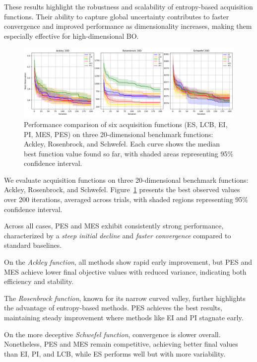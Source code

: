 \documentclass{ut-thesis}
\begin{document}
These results highlight the robustness and scalability of entropy-based acquisition functions. Their ability to capture global uncertainty contributes to faster convergence and improved performance as dimensionality increases, making them especially effective for high-dimensional BO.

\begin{figure}[!t]
    \centering
    \includegraphics[width=\textwidth]{across_function.png}
    \caption[20-Dimension benchmark comparison of acquisition functions]{
        Performance comparison of six acquisition functions (ES, LCB, EI, PI, MES, PES) on three 20-dimensional benchmark functions: Ackley, Rosenbrock, and Schwefel.
        Each curve shows the median best function value found so far, with shaded areas representing 95\% confidence interval.
    }
    \label{fig:benchmark_20d}
\end{figure}

We evaluate acquisition functions on three 20-dimensional benchmark functions: Ackley, Rosenbrock, and Schwefel. Figure~\ref{fig:benchmark_20d} presents the best observed values over 200 iterations, averaged across trials, with shaded regions representing 95\% confidence interval. 

Across all cases, PES and MES exhibit consistently strong performance, characterized by a \textit{steep initial decline} and \textit{faster convergence} compared to standard baselines.

On the \textit{Ackley function}, all methods show rapid early improvement, but PES and MES achieve lower final objective values with reduced variance, indicating both efficiency and stability.

The \textit{Rosenbrock function}, known for its narrow curved valley, further highlights the advantage of entropy-based methods. PES achieves the best results, maintaining steady improvement where methods like EI and PI stagnate early.

On the more deceptive \textit{Schwefel function}, convergence is slower overall. Nonetheless, PES and MES remain competitive, achieving better final values than EI, PI, and LCB, while ES performs well but with more variability.
\end{document}
